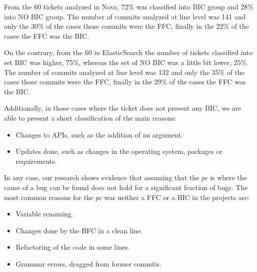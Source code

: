 \documentclass[conference]{IEEEtran}
\begin{document}
From the 60 tickets analyzed in Nova, 72\% was classified into BIC group and 28\% into NO BIC group. The number of commits analyzed at line level was 141 and only the 30\% of the cases those commits were the FFC, finally in the 22\% of the cases the FFC was the BIC.

On the contrary, from the 60 in ElasticSearch the number of tickets classified into set BIC was higher, 75\%, whereas the set of NO BIC was a little bit lower, 25\%. The number of commits analyzed at line level was 132 and only the 35\% of the cases those commits were the FFC, finally in the 29\% of the cases the FFC was the BIC.


Additionally, in those cases where the ticket does not present any BIC, we are able to present a short classification of the main reasons:
\begin{itemize}
  \item Changes to APIs, such as the addition of an argument. 
  \item Updates done, such as changes in the operating system, packages or requirements.
\end{itemize}

In any case, our research shows evidence that assuming that the $pc$ is where the cause of a bug can be found does not hold for a significant fraction of bugs. The most common reasons for the $pc$ was neither a FFC or a BIC in the projects are:

\begin{itemize}
  \item Variable renaming.
  \item Changes done by the BFC in a clean line.
  \item Refactoring of the code in some lines.
  \item Grammar errors, dragged from former commits.
\end{itemize} 
%
\end{document}
